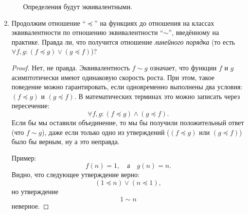 \begin{enumerate}
\begin{enumerate}
      Определения будут эквивалентными.
    \end{enumerate}

  \item
    Продолжим отношение ``$\preceq$'' на функциях до отношения на классах эквивалентности по отношению эквивалентности ``$\sim$'', введённому на практике. Правда ли, что получится отношение \textit{линейного порядка} (то есть
    $\forall f, g: (f \preceq g) \lor (g \preceq f)$)?
    \begin{proof}
      Нет, не правда. Эквивалентность $f \sim g$ означает, что функции $f$ и $g$ асимптотически имеют одинаковую скорость роста. При этом, такое поведение можно гарантировать, если одновременно выполнены два условия: $(f \preceq g)$ и $(g \preceq f)$. В математических терминах это можно записать через пересечение:
      \begin{equation}
        \forall f, g: (f \preceq g) \land (g \preceq f).
      \end{equation}
      Если бы мы оставили объединение, то мы бы получили положительный ответ (что $f \sim g$), даже если только одно из утверждений ($(f \preceq g)$ или $(g \preceq f)$) было бы верным, ну а это неправда.
      
      Пример:
      \begin{equation}
        f(n) = 1, \quad \text{а} \quad g(n) = n.
      \end{equation}
      Видно, что следующее утверждение верно:
      \begin{equation}
        (1 \preceq n) \lor (n \preceq 1),
      \end{equation}
      но утверждение
      \begin{equation}
        1 \sim n
      \end{equation}
      неверное.
    \end{proof}


\end{enumerate}
